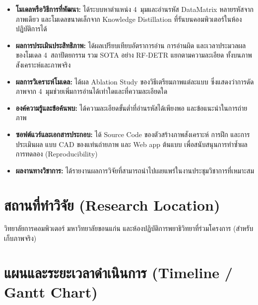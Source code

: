 \documentclass[20pt,a4paper]{article}
\begin{document}
\begin{itemize}

    \item \textbf{โมเดลหรือวิธีการที่พัฒนา:}
    ได้ระบบหาตำแหน่ง 4~มุมและอ่านรหัส DataMatrix หลายรหัสจากภาพเดียว
    และโมเดลขนาดเล็กจาก Knowledge Distillation ที่รันบนคอมพิวเตอร์ในห้องปฏิบัติการได้

    \item \textbf{ผลการประเมินประสิทธิภาพ:}
    ได้ผลเปรียบเทียบอัตราการอ่าน การอ่านผิด และเวลาประมวลผลของโมเดล 4~สถาปัตยกรรม
    รวม SOTA อย่าง RF-DETR แยกตามความละเอียด ทั้งบนภาพสังเคราะห์และภาพจริง

    \item \textbf{ผลการวิเคราะห์โมเดล:}
    ได้ผล Ablation Study ของวิธีเตรียมภาพแต่ละแบบ
    ซึ่งแสดงว่าการดัดภาพจาก 4~มุมช่วยเพิ่มการอ่านได้เท่าใดและที่ความละเอียดใด

    \item \textbf{องค์ความรู้และข้อค้นพบ:}
    ได้ความละเอียดขั้นต่ำที่อ่านรหัสได้เพียงพอ และข้อแนะนำในการถ่ายภาพ

    \item \textbf{ซอฟต์แวร์และเอกสารประกอบ:}
    ได้ Source Code ของตัวสร้างภาพสังเคราะห์ การฝึก และการประเมินผล
    แบบ CAD ของแท่นถ่ายภาพ และ Web app ต้นแบบ
    เพื่อสนับสนุนการทำซ้ำผลการทดลอง (Reproducibility)

    \item \textbf{ผลงานทางวิชาการ:}
    ได้รายงานผลการวิจัยที่สามารถนำไปเผยแพร่ในงานประชุมวิชาการที่เหมาะสม

\end{itemize}


\section{สถานที่ทำวิจัย (Research Location)}

วิทยาลัยการคอมพิวเตอร์ มหาวิทยาลัยขอนแก่น
และห้องปฏิบัติการพยาธิวิทยาที่ร่วมโครงการ (สำหรับเก็บภาพจริง)


\section{แผนและระยะเวลาดำเนินการ
(Timeline / Gantt Chart)}
\end{document}
